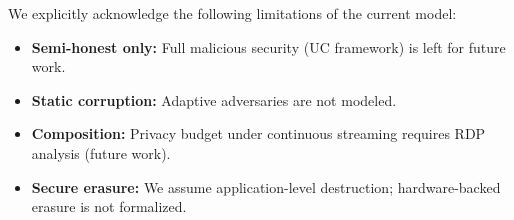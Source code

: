 We explicitly acknowledge the following
limitations of the current model:

\begin{itemize}
\item \textbf{Semi-honest only:}
Full malicious security (UC framework)
is left for future work.
\item \textbf{Static corruption:}
Adaptive adversaries are not modeled.
\item \textbf{Composition:}
Privacy budget under continuous streaming
requires RDP analysis (future work).
\item \textbf{Secure erasure:}
We assume application-level destruction;
hardware-backed erasure is not formalized.
\end{itemize}
